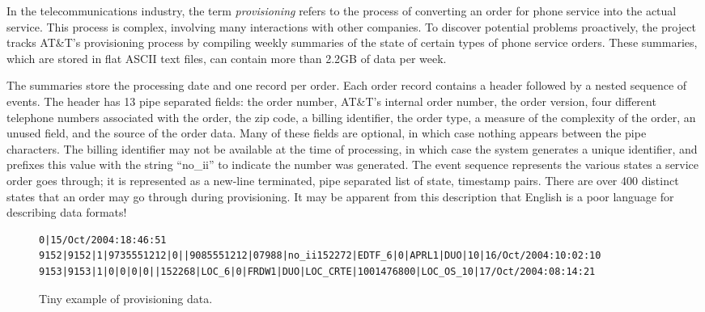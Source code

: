 In the telecommunications industry, the term \textit{provisioning} refers to
the process of converting an order for phone service into the
actual service.  This process is complex, involving many interactions
with other companies.  To discover potential problems proactively, the \dibbler{}
project tracks AT\&T's provisioning process by compiling weekly
summaries of the state of certain types of phone service orders.
These summaries, which are stored in flat ASCII text files, can
contain more than 2.2GB of data per week.

The summaries store the processing date
and one record per order.  Each order record contains a header
followed by a nested sequence of events.  The header has 13 pipe
separated fields: the order number, AT\&T's internal order number, the
order version, four different telephone numbers associated with the
order, the zip code, a billing identifier, the order
type, a measure of the complexity of the order, an unused field, and
the source of the order data.  Many of these fields are optional, in
which case nothing appears between the pipe characters.  The billing
identifier may not be available at the time of processing, in which
case the system generates a unique identifier, and prefixes this value
with the string ``no\_ii'' to indicate the number was generated. The
event sequence represents the various states a service order goes
through; it is represented as a new-line terminated, pipe separated
list of state, timestamp pairs.  There are over 400 distinct states
that an order may go through during provisioning.  It may be apparent from
this description that English is a poor language for describing data
formats!

\begin{figure*}
\begin{small}
\begin{center}
\begin{verbatim}
0|15/Oct/2004:18:46:51
9152|9152|1|9735551212|0||9085551212|07988|no_ii152272|EDTF_6|0|APRL1|DUO|10|16/Oct/2004:10:02:10
9153|9153|1|0|0|0|0||152268|LOC_6|0|FRDW1|DUO|LOC_CRTE|1001476800|LOC_OS_10|17/Oct/2004:08:14:21
\end{verbatim}
\caption{Tiny example of \dibbler{} provisioning data.}
\label{figure:dibbler-records}
\end{center}
\end{small}
\end{figure*}

